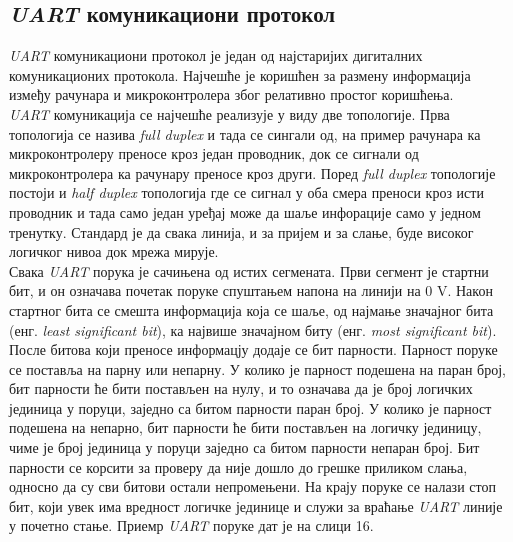 \documentclass{article}
\begin{document}
\subsection{\textit{UART} комуникациони протокол}
\textit{UART} комуникациони протокол је један од најстаријих дигиталних комуникационих протокола. Најчешће је коришћен за размену информација између рачунара и микроконтролера због релативно простог коришћења.\\
\textit{UART} комуникација се најчешће реализује у виду две топологије. Прва топологија се назива \textit{full duplex} и тада се сингали од, на пример рачунара ка микроконтролеру преносе кроз један проводник, док се сигнали од микроконтролера ка рачунару преносе кроз други. Поред \textit{full duplex} топологије постоји и \textit{half duplex} топологија где се сигнал у оба смера преноси кроз исти проводник и тада само један уређај може да шаље инфорације само у једном тренутку. Стандард је да свака линија, и за пријем и за слање, буде високог логичког нивоа док мрежа мирује.\\
Свака \textit{UART} порука је сачињена од истих сегмената. Први сегмент је стартни бит, и он означава почетак поруке спуштањем напона на линији на 0 V. Након стартног бита се смешта информација која се шаље, од најмање значајног бита (енг. \textit{least significant bit}), ка највише значајном биту (енг. \textit{most significant bit}). После битова који преносе информацју додаје се бит парности. Парност поруке се поставља на парну или непарну. У колико је парност подешена на паран број, бит парности ће бити постављен на нулу, и то означава да је број логичких јединица у поруци, заједно са битом парности паран број. У колико је парност подешена на непарно, бит парности ће бити постављен на логичку јединицу, чиме је број јединица у поруци заједно са битом парности непаран број. Бит парности се корсити за проверу да није дошло до грешке приликом слања, односно да су сви битови остали непромењени. На крају поруке се налази стоп бит, који увек има вредност логичке јединице и служи за враћање \textit{UART} линије у почетно стање. Приемр \textit{UART} поруке дат је на слици 16.
\end{document}

